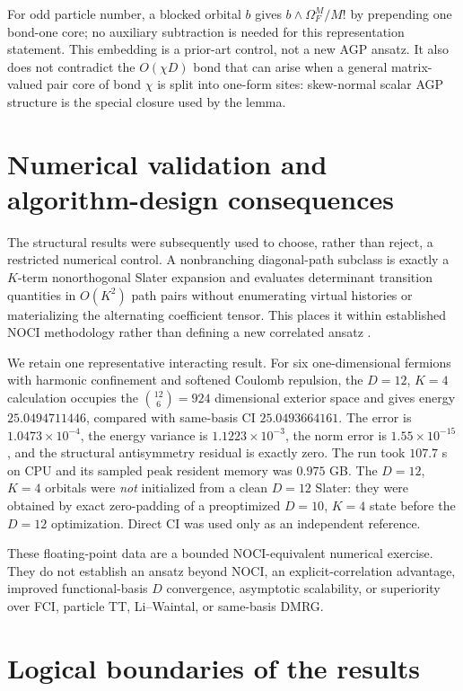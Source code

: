 \documentclass[11pt]{article}
\theoremstyle{definition}
\begin{document}
For odd particle number, a blocked orbital $b$ gives
$b\wedge\Omega_F^M/M!$ by prepending one bond-one core; no auxiliary
subtraction is needed for this representation statement.  This embedding is
a prior-art control, not a new AGP ansatz.  It also does not contradict the
$O(\chi D)$ bond that can arise when a general matrix-valued pair core of bond
$\chi$ is split into one-form sites: skew-normal scalar AGP structure is the
special closure used by the lemma.

\section{Numerical validation and algorithm-design consequences}

The structural results were subsequently used to choose, rather than reject,
a restricted numerical control.  A nonbranching diagonal-path subclass is
exactly a $K$-term nonorthogonal Slater expansion and evaluates determinant
transition quantities in $O(K^2)$ path pairs without enumerating virtual
histories or materializing the alternating coefficient tensor.  This places it
within established NOCI methodology rather than defining a new correlated
ansatz \cite{ThomHeadGordon2009NOCI,BeylkinMohlenkampPerez2008SlaterSums}.

We retain one representative interacting result.  For six one-dimensional
fermions with harmonic confinement and softened Coulomb repulsion, the
$D=12$, $K=4$ calculation occupies the $\binom{12}{6}=924$ dimensional exterior
space and gives energy $25.0494711446$, compared with same-basis CI
$25.0493664161$.  The error is $1.0473\times10^{-4}$, the energy variance is
$1.1223\times10^{-3}$, the norm error is $1.55\times10^{-15}$, and the
structural antisymmetry residual is exactly zero.  The run took $107.7$ s on
CPU and its sampled peak resident memory was $0.975$ GB.  The $D=12$, $K=4$
orbitals were \emph{not} initialized from a clean $D=12$ Slater: they were
obtained by exact zero-padding of a preoptimized $D=10$, $K=4$ state before the
$D=12$ optimization.  Direct CI was used only as an independent reference.

These floating-point data are a bounded NOCI-equivalent numerical exercise.
They do not establish an ansatz beyond NOCI, an explicit-correlation advantage,
improved functional-basis $D$ convergence, asymptotic scalability, or
superiority over FCI, particle TT, Li--Waintal, or same-basis DMRG.

\section{Logical boundaries of the results}
\end{document}
